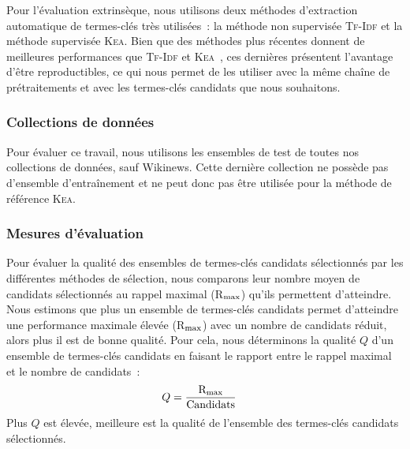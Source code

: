         Pour l'évaluation extrinsèque, nous utilisons deux méthodes d'extraction
        automatique de termes-clés très utilisées~: la méthode non supervisée
        \textsc{Tf-Idf} et la méthode supervisée \textsc{Kea}. Bien que des
        méthodes plus récentes donnent de meilleures performances que
        \textsc{Tf-Idf} et \textsc{Kea}~\cite{kim2010semeval}, ces dernières
        présentent l'avantage d'être reproductibles, ce qui nous permet de les
        utiliser avec la même chaîne de prétraitements et avec les termes-clés
        candidats que nous souhaitons.

      \subsubsection{Collections de données}
      \label{subsubsec:main:domain_independent_keyphrase_extraction-keyphrase_candidate_selection-evaluation-evaluation_data}
        Pour évaluer ce travail, nous utilisons les ensembles de test de toutes
        nos collections de données, sauf Wikinews. Cette dernière collection ne
        possède pas d'ensemble d'entraînement et ne peut donc pas être utilisée
        pour la méthode de référence \textsc{Kea}.
      
      \subsubsection{Mesures d'évaluation}
      \label{subsubsec:main:domain_independent_keyphrase_extraction-keyphrase_candidate_selection-evaluation-evaluation_measures}
        Pour évaluer la qualité des ensembles de termes-clés candidats
        sélectionnés par les différentes méthodes de sélection, nous comparons
        leur nombre moyen de candidats sélectionnés au rappel maximal
        (R$_\textnormal{max}$) qu'ils permettent d'atteindre. Nous estimons que
        plus un ensemble de termes-clés candidats permet d'atteindre une
        performance maximale élevée (R$_\textnormal{max}$) avec un nombre de
        candidats réduit, alors plus il est de bonne qualité. Pour cela, nous
        déterminons la qualité $Q$ d'un ensemble de termes-clés candidats en
        faisant le rapport entre le rappel maximal et le nombre de candidats~:
        \begin{align}
          Q &= \frac{\textnormal{R}_{\textnormal{max}}}{\textnormal{Candidats}}
        \end{align}
        Plus $Q$ est élevée, meilleure est la qualité de l'ensemble des
        termes-clés candidats sélectionnés.

